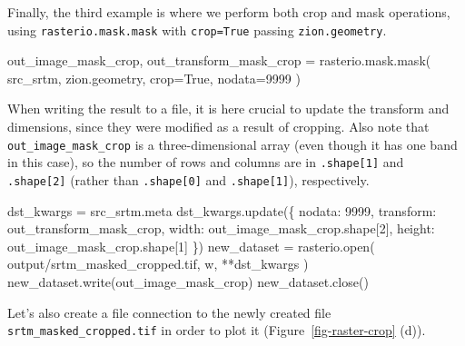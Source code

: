 \documentclass[
  letterpaper,
]{krantz}
\newenvironment{Shaded}{\begin{snugshade}}{\end{snugshade}}
\newcommand{\BuiltInTok}[1]{\textcolor[rgb]{0.00,0.23,0.31}{#1}}
\newcommand{\DecValTok}[1]{\textcolor[rgb]{0.68,0.00,0.00}{#1}}
\newcommand{\NormalTok}[1]{\textcolor[rgb]{0.00,0.23,0.31}{#1}}
\newcommand{\OperatorTok}[1]{\textcolor[rgb]{0.37,0.37,0.37}{#1}}
\newcommand{\StringTok}[1]{\textcolor[rgb]{0.13,0.47,0.30}{#1}}
\newcommand{\VariableTok}[1]{\textcolor[rgb]{0.07,0.07,0.07}{#1}}
\begin{document}
Finally, the third example is where we perform both crop and mask
operations, using \texttt{rasterio.mask.mask} with \texttt{crop=True}
passing \texttt{zion.geometry}.

\begin{Shaded}
\begin{Highlighting}[]
\NormalTok{out\_image\_mask\_crop, out\_transform\_mask\_crop }\OperatorTok{=}\NormalTok{ rasterio.mask.mask(}
\NormalTok{    src\_srtm, }
\NormalTok{    zion.geometry, }
\NormalTok{    crop}\OperatorTok{=}\VariableTok{True}\NormalTok{, }
\NormalTok{    nodata}\OperatorTok{=}\DecValTok{9999}
\NormalTok{)}
\end{Highlighting}
\end{Shaded}

When writing the result to a file, it is here crucial to update the
transform and dimensions, since they were modified as a result of
cropping. Also note that \texttt{out\_image\_mask\_crop} is a
three-dimensional array (even though it has one band in this case), so
the number of rows and columns are in \texttt{.shape{[}1{]}} and
\texttt{.shape{[}2{]}} (rather than \texttt{.shape{[}0{]}} and
\texttt{.shape{[}1{]}}), respectively.

\begin{Shaded}
\begin{Highlighting}[]
\NormalTok{dst\_kwargs }\OperatorTok{=}\NormalTok{ src\_srtm.meta}
\NormalTok{dst\_kwargs.update(\{}
    \StringTok{\textquotesingle{}nodata\textquotesingle{}}\NormalTok{: }\DecValTok{9999}\NormalTok{,}
    \StringTok{\textquotesingle{}transform\textquotesingle{}}\NormalTok{: out\_transform\_mask\_crop,}
    \StringTok{\textquotesingle{}width\textquotesingle{}}\NormalTok{: out\_image\_mask\_crop.shape[}\DecValTok{2}\NormalTok{],}
    \StringTok{\textquotesingle{}height\textquotesingle{}}\NormalTok{: out\_image\_mask\_crop.shape[}\DecValTok{1}\NormalTok{]}
\NormalTok{\})}
\NormalTok{new\_dataset }\OperatorTok{=}\NormalTok{ rasterio.}\BuiltInTok{open}\NormalTok{(}
    \StringTok{\textquotesingle{}output/srtm\_masked\_cropped.tif\textquotesingle{}}\NormalTok{, }
    \StringTok{\textquotesingle{}w\textquotesingle{}}\NormalTok{, }
    \OperatorTok{**}\NormalTok{dst\_kwargs}
\NormalTok{)}
\NormalTok{new\_dataset.write(out\_image\_mask\_crop)}
\NormalTok{new\_dataset.close()}
\end{Highlighting}
\end{Shaded}

Let's also create a file connection to the newly created file
\texttt{srtm\_masked\_cropped.tif} in order to plot it
(Figure~\ref{fig-raster-crop} (d)).
\end{document}
